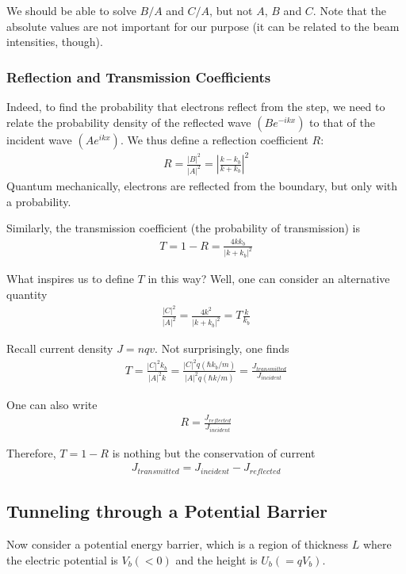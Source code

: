 We should be able to solve $B/A$ and $C/A$, but not $A$, $B$ and $C$. Note that the absolute values are not important for our purpose (it can be related to the beam intensities, though). 

\subsubsection{Reflection and Transmission Coefficients}
Indeed, to find the probability that electrons reflect from the step, we need to relate the probability density of the reflected wave $(Be^{-ikx})$ to that of the incident wave $(Ae^{ikx})$. We thus define a reflection coefficient $R$: 
\begin{align*}
    R=\frac{|B|^2}{|A|^2}=\left|\frac{k-k_b}{k+k_b}\right|^2
\end{align*}
Quantum mechanically, electrons are reflected from the boundary, but only with a probability. 

Similarly, the transmission coefficient (the probability of transmission) is 
\begin{align*}
    T=1-R=\frac{4kk_b}{|k+k_b|^2}
\end{align*}

What inspires us to define $T$ in this way? Well, one can consider an alternative quantity
\begin{align*}
    \frac{|C|^2}{|A|^2}=\frac{4k^2}{|k+k_b|^2}=T\frac{k}{k_b}
\end{align*}

Recall current density $J=nqv$. Not surprisingly, one finds
\begin{align*}
    T=\frac{|C|^2 k_b}{|A|^2 k}=\frac{|C|^2 q(\hbar k_b /m)}{|A|^2 q(\hbar k/m)}=\frac{J_{transmitted}}{J_{incident}}
\end{align*}

One can also write 
\begin{align*}
    R=\frac{J_{reflected}}{J_{incident}}
\end{align*}

Therefore, $T=1-R$ is nothing but the conservation of current
\begin{align*}
    J_{transmitted}=J_{incident}-J_{reflected}
\end{align*}

\subsection{Tunneling through a Potential Barrier}
Now consider a potential energy barrier, which is a region of thickness $L$ where the electric potential is $V_b (<0)$ and the height is $U_b (=qV_b)$.

